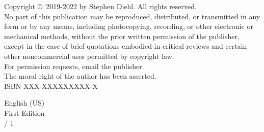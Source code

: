 \newpage

\noindent
Copyright \copyright \ 2019-2022 by Stephen Diehl. All rights reserved.\\

\noindent
No part of this publication may be reproduced, distributed,
or transmitted in any form or by any means, including photocopying, recording,
or other electronic or mechanical methods, without the prior written permission
of the publisher, except in the case of brief quotations embodied in critical
reviews and certain other noncommercial uses permitted by copyright law.\\

\noindent
For permission requests, email the publisher.\\

\noindent
The moral right of the author has been asserted.\\

\noindent
ISBN XXX-XXXXXXXXX-X

\noindent
English (US)\\

\noindent
First Edition\\

 / 1\\
